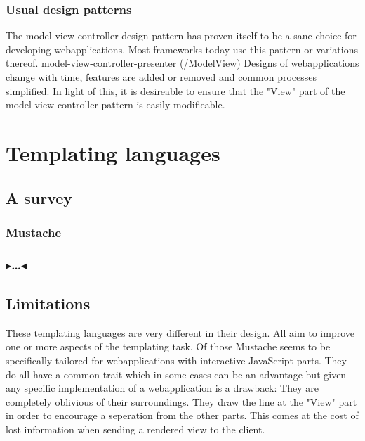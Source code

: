 \documentclass[twoside,11pt,openright]{report}
\newcommand{\todo}[1]{{\color[rgb]{.5,0,0}\textbf{$\blacktriangleright$#1$\blacktriangleleft$}}}
\begin{document}
\subsection{Usual design patterns}
The model-view-controller design pattern has proven itself to be a sane
choice for developing webapplications. Most frameworks today use this
pattern or variations thereof.
model-view-controller-presenter (/ModelView)
Designs of webapplications change with time, features are added or
removed and common processes simplified. In light of this, it is
desireable to ensure that the "View" part of the model-view-controller
pattern is easily modifieable.


\chapter{Templating languages}
\section{A survey}
\subsection{Mustache}
\subsection{\todo{\dots}}
\section{Limitations}
These templating languages are very different in their design.
All aim to improve one or more aspects of the templating task.
Of those Mustache seems to be specifically tailored for webapplications
with interactive JavaScript parts.
They do all have a common trait which in some cases can be an advantage
but given any specific implementation of a webapplication is a drawback:
They are completely oblivious of their surroundings. They draw the line
at the "View" part in order to encourage a seperation from the other
parts. This comes at the cost of lost information when sending a
rendered view to the client.

\end{document}
